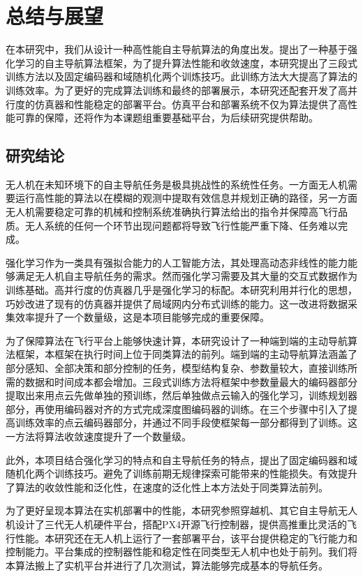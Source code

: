 
\chapter{总结与展望}
\label{final}

在本研究中，我们从设计一种高性能自主导航算法的角度出发。提出了一种基于强化学习的自主导航算法框架，为了提升算法性能和收敛速度，本研究提出了三段式训练方法以及固定编码器和域随机化两个训炼技巧。此训练方法大大提高了算法的训练效率。为了更好的完成算法训练和最终的部署展示，本研究还配套开发了高并行度的仿真器和性能稳定的部署平台。仿真平台和部署系统不仅为算法提供了高性能可靠的保障，还将作为本课题组重要基础平台，为后续研究提供帮助。

\section{研究结论}

无人机在未知环境下的自主导航任务是极具挑战性的系统性任务。一方面无人机需要运行高性能的算法以在模糊的观测中提取有效信息并规划正确的路径，另一方面无人机需要稳定可靠的机械和控制系统准确执行算法给出的指令并保障高飞行品质。无人系统的任何一个环节出现问题都将导致飞行性能严重下降、任务难以完成。

强化学习作为一类具有强拟合能力的人工智能方法，其处理高动态非线性的能力能够满足无人机自主导航任务的需求。然而强化学习需要及其大量的交互式数据作为训练基础。高并行度的仿真器几乎是强化学习的标配。本研究利用并行化的思想，巧妙改进了现有的仿真器并提供了局域网内分布式训练的能力。这一改进将数据采集效率提升了一个数量级，这是本项目能够完成的重要保障。

为了保障算法在飞行平台上能够快速计算，本研究设计了一种端到端的主动导航算法框架，本框架在执行时间上位于同类算法的前列。端到端的主动导航算法涵盖了部分感知、全部决策和部分控制的任务，模型结构复杂、参数量较大，直接训练所需的数据和时间成本都会增加。三段式训练方法将框架中参数量最大的编码器部分提取出来用点云先做单独的预训练，然后单独做点云输入的强化学习，训练规划器部分，再使用编码器对齐的方式完成深度图编码器的训练。在三个步骤中引入了提高训练效率的点云编码器部分，并通过不同手段使框架每一部分都得到了训练。这一方法将算法收敛速度提升了一个数量级。

此外，本项目结合强化学习的特点和自主导航任务的特点，提出了固定编码器和域随机化两个训练技巧。避免了训练前期无规律探索可能带来的性能损失。有效提升了算法的收敛性能和泛化性，在速度的泛化性上本方法处于同类算法前列。

为了更好呈现本算法在实机部署中的性能，本研究参照穿越机、其它自主导航无人机设计了三代无人机硬件平台，搭配PX4开源飞行控制器，提供高推重比灵活的飞行性能。本研究还在无人机上运行了一套部署平台，该平台提供稳定的飞行能力和控制能力。平台集成的控制器性能和稳定性在同类型无人机中也处于前列。我们将本算法搬上了实机平台并进行了几次测试，算法能够完成基本的导航任务。

